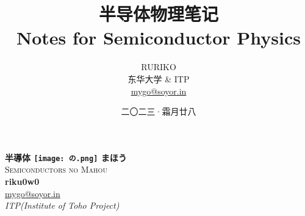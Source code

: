 \documentclass{report}
\title{\Huge\textbf{半导体物理笔记}\\ \vspace{1ex}\LARGE Notes for Semiconductor Physics}
\author{\Large RURIKO\vspace{2ex} \\ \vspace{2ex}东华大学 \& ITP \\ \href{mailto:mygo@soyor.in}{mygo@soyor.in}}
\date{二〇二三·霜月廿八}
\numberwithin{equation}{section}
\begin{document}
\begin{titlepage}
\begin{center}
  {\Huge\mincho \bfseries 半導体 \texttt{[image: の.png]} まほう}\\[2ex]
  \textsc{\LARGE Semiconductors no Mahou}\\[6.5ex]
  {\large\bfseries riku0w0}           \\
  \vspace{4ex}
  \href{mailto:mygo@soyor.in}{mygo@soyor.in}                    \\[5pt]
  \textit{ITP(Institute of Toho Project)}                \\[0.8cm]
  \begin{figure}[H]
      \centering
\iffalse
{} %

\begin{tikzpicture}[x=0.75pt,y=0.75pt,yscale=-1,xscale=1]


\end{tikzpicture}
\end{figure}
\end{center}
\end{titlepage}
\end{document}
